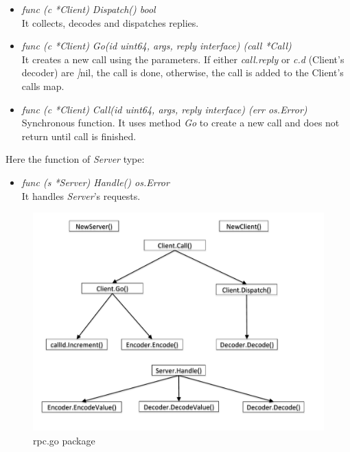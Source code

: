 \begin{itemize}

\item \emph{func (c *Client) Dispatch() bool}\\
It collects, decodes and dispatches replies.

\item \emph{func (c *Client) Go(id uint64, args, reply interface{}) (call *Call)}\\
It creates a new call using the parameters. If either \emph{call.reply} or \emph{c.d} (Client's decoder) are \emph]{nil}, the call is done, otherwise, the call is added to the Client's calls map.

\item \emph{func (c *Client) Call(id uint64, args, reply interface{}) (err os.Error)}\\
Synchronous function. It uses method \emph{Go} to create a new call and does not return until call is finished. 

\end{itemize}
Here the function of \emph{Server} type:

\begin{itemize}

\item \emph{func (s *Server) Handle() os.Error}\\
It handles \emph{Server}'s requests.

\end{itemize}


\begin{figure}[H]
\centering
\includegraphics[scale=0.50]{RpcPackage}
\caption{rpc.go package}
\end{figure}